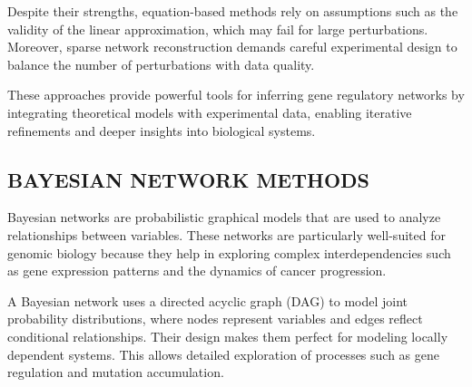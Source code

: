 Despite their strengths, equation-based methods rely on assumptions such as the validity of the linear approximation, which may fail for large perturbations.
Moreover, sparse network reconstruction demands careful experimental design to balance the number of perturbations with data quality\cite{yeung_reverse_2002}.


\noindent These approaches provide powerful tools for inferring gene regulatory networks by integrating theoretical models with experimental data, enabling iterative refinements and deeper insights into biological systems.


\subsection{BAYESIAN NETWORK METHODS}\label{subsec:bayesian-network-methods}

Bayesian networks are probabilistic graphical models that are used to analyze relationships between variables.
These networks are particularly well-suited for genomic biology because they help in exploring complex interdependencies such as gene expression patterns and the dynamics of cancer progression\cite{friedman_using_2000, gerstung_quantifying_2009}.

A Bayesian network uses a directed acyclic graph (DAG) to model joint probability distributions, where nodes represent variables and edges reflect conditional relationships.
Their design makes them perfect for modeling locally dependent systems.
This allows detailed exploration of processes such as gene regulation and mutation accumulation\cite{friedman_using_2000}.

